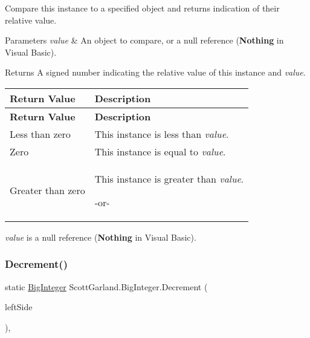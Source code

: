 Compare this instance to a specified object and returns indication of their relative value. 


\begin{DoxyParams}{Parameters}
{\em value} & An object to compare, or a null reference ({\bfseries Nothing} in Visual Basic).\\
\hline
\end{DoxyParams}
\begin{DoxyReturn}{Returns}
A signed number indicating the relative value of this instance and {\itshape value}. \tabulinesep=1mm
\begin{longtabu} spread 0pt [c]{*{2}{|X[-1]}|}
\hline
\rowcolor{\tableheadbgcolor}\textbf{ Return Value }&\textbf{ Description  }\\
\endfirsthead
\hline
\endfoot
\hline
\rowcolor{\tableheadbgcolor}\textbf{ Return Value }&\textbf{ Description  }\\
\endhead
Less than zero &This instance is less than {\itshape value}.  \\
Zero &This instance is equal to {\itshape value}.  \\
Greater than zero &This instance is greater than {\itshape value}. 

-\/or-\/\\
\end{longtabu}

\end{DoxyReturn}
{\itshape value} is a null reference ({\bfseries Nothing} in Visual Basic).   \mbox{\label{class_scott_garland_1_1_big_integer_affa766b6b0b77a333971307b90a66aa0}} 
\subsubsection{\texorpdfstring{Decrement()}{Decrement()}}
{\footnotesize\ttfamily static \hyperlink{class_scott_garland_1_1_big_integer}{Big\+Integer} Scott\+Garland.\+Big\+Integer.\+Decrement (\begin{DoxyParamCaption}\item[{\hyperlink{class_scott_garland_1_1_big_integer}{Big\+Integer}}]{left\+Side }\end{DoxyParamCaption})\hspace{0.3cm}{\ttfamily [inline]}, {\ttfamily [static]}}



